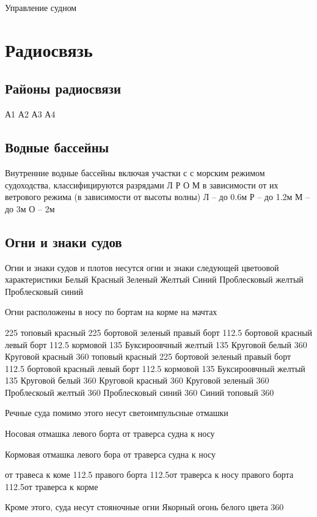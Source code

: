 \documentclass{article}        %
\begin{document}
\begin{description}
Управление судном

\section{Радиосвязь}

\subsection{Районы радиосвязи}
А1
А2
А3
А4
\subsection{Водные бассейны}
Внутренние водные бассейны включая участки с с морским режимом судоходства, классифицируются разрядами 
Л Р О М в зависимости от их ветрового режима (в зависимости от высоты волны)
Л -- до 0.6м
Р -- до 1.2м
М -- до 3м
О -- 2м

\subsection{Огни и знаки судов}
Огни и знаки судов и плотов несутся огни и знаки следующей цветоовой характеристики
Белый
Красный
Зеленый
Желтый
Синий
Проблесковый желтый
Проблесковый синий

Огни расположены
в носу
по бортам
на корме
на мачтах


225\degree
топовый красный
225\degree
бортовой зеленый правый борт 112.5\degree
бортовой красный левый борт 112.5\degree
кормовой 135\degree
Буксироовчный желтый 135\degree
Круговой белый 360\degree
Круговой красный 360\degree
топовый красный
225\degree
бортовой зеленый правый борт 112.5\degree
бортовой красный левый борт 112.5\degrees
кормовой 135\degrees
Буксироовчный желтый 135\degree
Круговой белый 360\degree
Круговой красный 360\degree
Круговой зеленый 360\degree
Проблескоый желтый 360\degree
Проблесковый синий 360\degree
Синий топовый 360\degree

Речные суда помимо этого несут светоимпульсные отмашки

Носовая отмашка левого борта от траверса судна к носу

Кормовая отмашка левого бора от траверса судна к носу

от травеса к коме 112.5\degree
правого борта 112.5\degree от траверса к носу
правого борта 112.5\degree от траверса к корме

Кроме этого, суда несут стояночные огни
Якорный огонь белого цвета 360\degree




\end{description}
\end{document}
